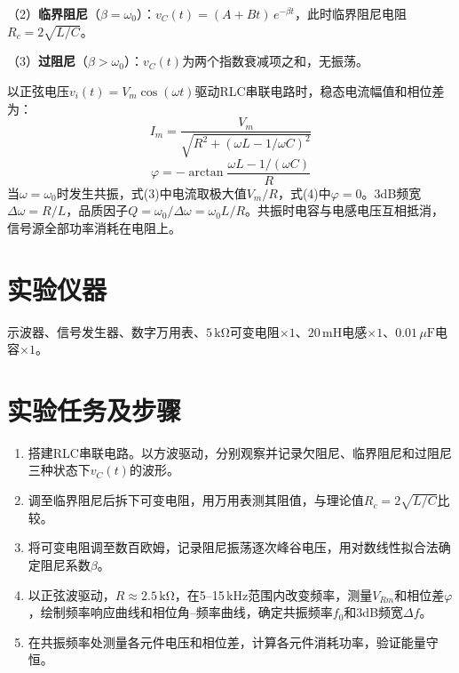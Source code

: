 \documentclass[12pt, a4paper]{article}
\begin{document}
（2）\textbf{临界阻尼}（$\beta = \omega_0$）：$v_C(t) = (A + Bt)\,e^{-\beta t}$，此时临界阻尼电阻$R_c = 2\sqrt{L/C}$。

（3）\textbf{过阻尼}（$\beta > \omega_0$）：$v_C(t)$为两个指数衰减项之和，无振荡。

\vspace{0.3cm}
以正弦电压$v_i(t) = V_m\cos(\omega t)$驱动RLC串联电路时，稳态电流幅值和相位差为：
\begin{equation}
    I_m = \frac{V_m}{\sqrt{R^2 + (\omega L - 1/\omega C)^2}}
\end{equation}
\begin{equation}
    \varphi = -\arctan\frac{\omega L - 1/(\omega C)}{R}
\end{equation}
当$\omega = \omega_0$时发生共振，式(3)中电流取极大值$V_m / R$，式(4)中$\varphi = 0$。3dB频宽$\Delta\omega = R/L$，品质因子$Q = \omega_0 / \Delta\omega = \omega_0 L / R$。共振时电容与电感电压互相抵消，信号源全部功率消耗在电阻上。

\section*{实验仪器}

示波器、信号发生器、数字万用表、$5\,\mathrm{k\Omega}$可变电阻$\times 1$、$20\,\mathrm{mH}$电感$\times 1$、$0.01\,\mu\mathrm{F}$电容$\times 1$。

\section*{实验任务及步骤}

\begin{enumerate}[label=\arabic*.]
    \item 搭建RLC串联电路。以方波驱动，分别观察并记录欠阻尼、临界阻尼和过阻尼三种状态下$v_C(t)$的波形。
    \item 调至临界阻尼后拆下可变电阻，用万用表测其阻值，与理论值$R_c = 2\sqrt{L/C}$比较。
    \item 将可变电阻调至数百欧姆，记录阻尼振荡逐次峰谷电压，用对数线性拟合法确定阻尼系数$\beta$。
    \item 以正弦波驱动，$R \approx 2.5\,\mathrm{k\Omega}$，在5--15\,kHz范围内改变频率，测量$V_{Rm}$和相位差$\varphi$，绘制频率响应曲线和相位角--频率曲线，确定共振频率$f_0$和3dB频宽$\Delta f$。
    \item 在共振频率处测量各元件电压和相位差，计算各元件消耗功率，验证能量守恒。
\end{enumerate}
\end{document}
